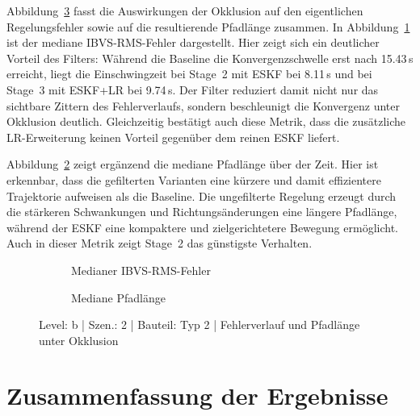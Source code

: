 Abbildung~\ref{fig:b_2_typ2_rms_path} fasst die Auswirkungen der Okklusion auf den eigentlichen Regelungsfehler sowie auf die resultierende Pfadlänge zusammen. In Abbildung~\ref{fig:b_2_Typ2_timeseries_median_ibvs_rms_px} ist der mediane \ac{IBVS}-RMS-Fehler dargestellt. Hier zeigt sich ein deutlicher Vorteil des Filters: Während die Baseline die Konvergenzschwelle erst nach 15.43\,s erreicht, liegt die Einschwingzeit bei Stage~2 mit \ac{ESKF} bei 8.11\,s und bei Stage~3 mit \ac{ESKF}+\ac{LR} bei 9.74\,s. Der Filter reduziert damit nicht nur das sichtbare Zittern des Fehlerverlaufs, sondern beschleunigt die Konvergenz unter Okklusion deutlich. Gleichzeitig bestätigt auch diese Metrik, dass die zusätzliche \ac{LR}-Erweiterung keinen Vorteil gegenüber dem reinen \ac{ESKF} liefert.

Abbildung~\ref{fig:b_2_Typ2_timeseries_median_path_length} zeigt ergänzend die mediane Pfadlänge über der Zeit. Hier ist erkennbar, dass die gefilterten Varianten eine kürzere und damit effizientere Trajektorie aufweisen als die Baseline. Die ungefilterte Regelung erzeugt durch die stärkeren Schwankungen und Richtungsänderungen eine längere Pfadlänge, während der \ac{ESKF} eine kompaktere und zielgerichtetere Bewegung ermöglicht. Auch in dieser Metrik zeigt Stage~2 das günstigste Verhalten.

\begin{figure}[htbp]
    \centering
    \begin{subfigure}[b]{0.49\textwidth}
        \caption{Medianer \ac{IBVS}-RMS-Fehler}
        \label{fig:b_2_Typ2_timeseries_median_ibvs_rms_px}
    \end{subfigure}
    \hfill
    \begin{subfigure}[b]{0.49\textwidth}
        \caption{Mediane Pfadlänge}
        \label{fig:b_2_Typ2_timeseries_median_path_length}
    \end{subfigure}
    \caption{Level: b | Szen.: 2 | Bauteil: Typ 2 | Fehlerverlauf und Pfadlänge unter Okklusion}
    \label{fig:b_2_typ2_rms_path}
\end{figure}

\section{Zusammenfassung der Ergebnisse}

